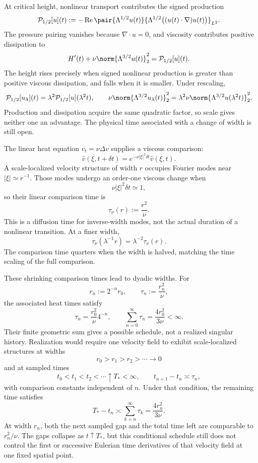 
At critical height, nonlinear transport contributes the signed production
\[
  \mathcal P_{1/2}[u](t)
  :=
  -\operatorname{Re}
  \pair
    {\Lambda^{1/2}u(t)}
    {\Lambda^{1/2}\bigl((u(t)\cdot\nabla)u(t)\bigr)}_{L^2}.
\]
The pressure pairing vanishes because \(\nabla\cdot u=0\), and viscosity contributes positive dissipation to
\[
  H'(t)
  +
  \nu\norm{\Lambda^{3/2}u(t)}_2^2
  =
  \mathcal P_{1/2}[u](t).
\]
The height rises precisely when signed nonlinear production is greater than positive viscous dissipation, and falls when it is smaller. Under rescaling,
\[
  \mathcal P_{1/2}[u_\lambda](t)
  =
  \lambda^2\mathcal P_{1/2}[u](\lambda^2t),
  \qquad
  \nu\norm{\Lambda^{3/2}u_\lambda(t)}_2^2
  =
  \lambda^2\nu\norm{\Lambda^{3/2}u(\lambda^2t)}_2^2.
\]
Production and dissipation acquire the same quadratic factor, so scale gives neither one an advantage. The physical time associated with a change of width is still open.


The linear heat equation \(v_t=\nu\Delta v\) supplies a viscous comparison:
\[
  \widehat v(\xi,t+\delta t)
  =
  e^{-\nu|\xi|^2\delta t}\widehat v(\xi,t).
\]
A scale-localized velocity structure of width \(r\) occupies Fourier modes near \(|\xi|\simeq r^{-1}\). Those modes undergo an order-one viscous change when
\[
  \nu|\xi|^2\delta t\simeq1,
\]
so their linear comparison time is
\[
  \tau_\nu(r)
  :=
  \frac{r^2}{\nu}.
\]
This is a diffusion time for inverse-width modes, not the actual duration of a nonlinear transition. At a finer width,
\[
  \tau_\nu(\lambda^{-1}r)
  =
  \lambda^{-2}\tau_\nu(r).
\]
The comparison time quarters when the width is halved, matching the time scaling of the full \NavierStokes{} comparison.


These shrinking comparison times lead to dyadic widths. For
\[
  r_n:=2^{-n}r_0,
  \qquad
  \tau_n:=\frac{r_n^2}{\nu},
\]
the associated heat times satisfy
\[
  \tau_n
  =
  \frac{r_0^2}{\nu}4^{-n},
  \qquad
  \sum_{n=0}^{\infty}\tau_n
  =
  \frac{4r_0^2}{3\nu}
  <
  \infty.
\]
Their finite geometric sum gives a possible schedule, not a realized singular history. Realization would require one \NavierStokes{} velocity field to exhibit scale-localized structures at widths
\[
  r_0>r_1>r_2>\cdots\longrightarrow0
\]
and at sampled times
\[
  t_0<t_1<t_2<\cdots\uparrow T_*<\infty,
  \qquad
  t_{n+1}-t_n\asymp\tau_n,
\]
with comparison constants independent of \(n\). Under that condition, the remaining time satisfies
\[
  T_*-t_n
  \asymp
  \sum_{k=n}^{\infty}\tau_k
  =
  \frac{4r_n^2}{3\nu}.
\]
At width \(r_n\), both the next sampled gap and the total time left are comparable to \(r_n^2/\nu\). The gaps collapse as \(t\uparrow T_*\), but this conditional schedule still does not control the first or successive Eulerian time derivatives of that velocity field at one fixed spatial point.
